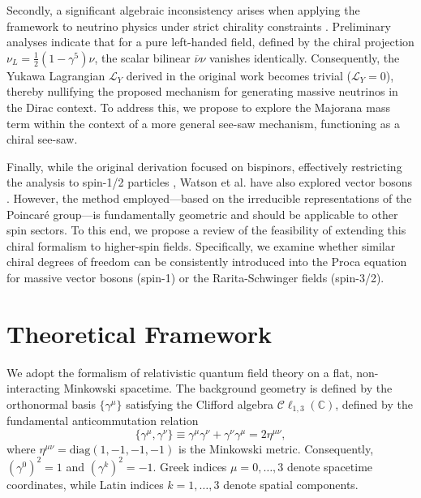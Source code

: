 Secondly, a significant algebraic inconsistency arises when applying the
framework to neutrino physics under strict chirality constraints \cite{watsonChiralSymmetryDirac2020}.
Preliminary analyses indicate that for a pure left-handed field, defined by the chiral
projection $\nu_L = \frac{1}{2}\left(1-\gamma^5\right)\nu$, the scalar bilinear
$\overline{\nu}\nu$ vanishes identically. Consequently, the Yukawa Lagrangian
$\mathcal{L}_Y$ derived in the original work becomes trivial
($\mathcal{L}_Y = 0$), thereby nullifying the proposed mechanism for generating
massive neutrinos in the Dirac context. To address this, we propose to explore
the Majorana mass term within the context of a more general see-saw mechanism,
functioning as a chiral see-saw.

Finally, while the original derivation focused on bispinors, effectively
restricting the analysis to spin-1/2 particles
\cite{watsonChiralSymmetryDirac2020}, Watson et al. have also explored
vector bosons \cite{Watson2022}. However, the method employed---based on the irreducible
representations of the Poincar\'{e} group---is fundamentally geometric and
should be applicable to other spin sectors. To this end, we propose a
review of the feasibility of extending this chiral formalism to
higher-spin fields. Specifically, we examine whether similar chiral degrees of
freedom can be consistently introduced into the Proca equation for massive
vector bosons (spin-1) or the Rarita-Schwinger fields (spin-3/2).
\section{Theoretical Framework}
\label{sec:Framework}

We adopt the formalism of relativistic quantum field theory on a flat,
non-interacting Minkowski spacetime. The background geometry is defined by the
orthonormal basis $\{ \gamma^\mu \}$ satisfying the Clifford algebra
$\mathcal{C}\ell_{1,3}(\mathbb{C})$, defined by the fundamental anticommutation
relation
\begin{equation}
	\{ \gamma^\mu, \gamma^\nu \} \equiv \gamma^\mu \gamma^\nu + \gamma^\nu
	\gamma^\mu = 2 \eta^{\mu \nu},
\end{equation}
where $\eta^{\mu \nu} = \text{diag}(1, -1, -1, -1)$ is the Minkowski metric.
Consequently, $(\gamma^0)^2 = 1$ and $(\gamma^k)^2 = -1$. Greek indices $\mu =
0, \dots, 3$ denote spacetime coordinates, while Latin indices $k = 1, \dots, 3$
denote spatial components.

